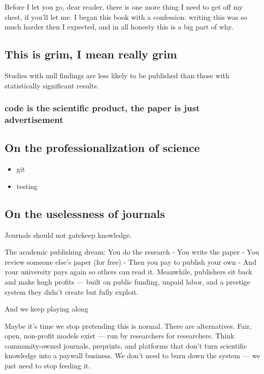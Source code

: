 \documentclass[
  letterpaper,
  DIV=11,
  numbers=noendperiod]{scrreport}
\providecommand{\tightlist}{%
  \setlength{\itemsep}{0pt}\setlength{\parskip}{0pt}}
\begin{document}
Before I let you go, dear reader, there is one more thing I need to get
off my chest, if you'll let me. I began this book with a confession:
writing this was so much harder then I expected, and in all honesty this
is a big part of why.

\subsection{This is grim, I mean really
grim}\label{this-is-grim-i-mean-really-grim}

Studies with null findings are less likely to be published than those
with statistically significant results.

\subsubsection{code is the scientific product, the paper is just
advertisement}\label{code-is-the-scientific-product-the-paper-is-just-advertisement}

\subsection{On the professionalization of
science}\label{on-the-professionalization-of-science}

\begin{itemize}
\tightlist
\item
  git
\item
  testing
\end{itemize}

\subsection{On the uselessness of
journals}\label{on-the-uselessness-of-journals}

Journals should not gatekeep knowledge.

The academic publishing dream: You do the research - You write the paper
- You review someone else's paper (for free) - Then you pay to publish
your own - And your university pays again so others can read it.
Meanwhile, publishers sit back and make hugh profits --- built on public
funding, unpaid labor, and a prestige system they didn't create but
fully exploit.

And we keep playing along

Maybe it's time we stop pretending this is normal. There are
alternatives. Fair, open, non-profit models exist --- run by researchers
for researchers. Think community-owned journals, preprints, and
platforms that don't turn scientific knowledge into a paywall business.
We don't need to burn down the system --- we just need to stop feeding
it.
\end{document}
